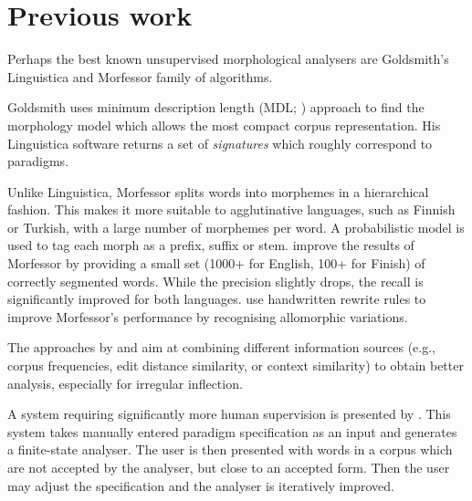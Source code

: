 \documentclass[11pt]{article}
\newcommand{\todojb}[1]{[\textbf{TODOJ} #1]} %
\begin{document}
\section{Previous work}

Perhaps the best known unsupervised morphological analysers are Goldsmith's Linguistica \cite{goldsmith01} and Morfessor \cite{creutz-lagus-2002-udm,creutz-lagus-2005,creutz07} family of algorithms. %

Gold\-smith uses minimum description length (MDL; \cite{rissanen-1989}) approach to find the morphology model which allows the most compact corpus representation. His Linguistica software returns a set of \emph{signatures} which roughly correspond to paradigms.


Unlike Linguistica, Morfessor splits words into morphemes in a hierarchical fashion. This makes it more suitable to agglutinative languages, such as Finnish or Turkish, with a large number of morphemes per word.
A probabilistic model is used to tag each morph as a prefix, suffix or stem.
%
\cite{kohonen-etal-2010} improve the results of Morfessor by providing a small set (1000+ for English, 100+ for Finish) of correctly segmented words.  While the precision slightly drops, the recall is significantly improved for both languages.
%
 use handwritten rewrite rules to improve Morfes\-sor's performance by recognising allomorphic variations.

The approaches by  and  aim at combining different information sources (e.g., corpus frequencies, edit distance similarity, or context similarity) to obtain better analysis, especially for irregular inflection.

A system requiring significantly more human supervision is presented by . This system takes manually entered paradigm specification as an input and generates a finite-state analyser. The user is then presented with words in a corpus which are not accepted by the analyser, but close to an accepted form. Then the user may adjust the specification and the analyser is iteratively improved.%
\end{document}
